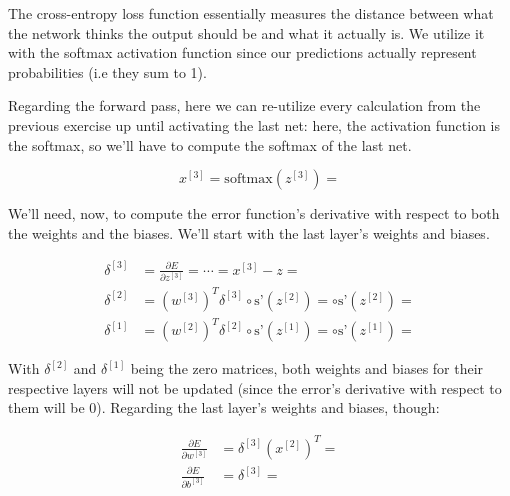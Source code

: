 \documentclass[12pt]{article}
\begin{document}
\begin{enumerate}[leftmargin=\labelsep]
  The cross-entropy loss function essentially measures the distance between what the
  network thinks the output should be and what it actually is. We utilize it with
  the softmax activation function since our predictions actually represent probabilities
  (i.e they sum to 1).

  Regarding the forward pass, here we can re-utilize every calculation from the previous
  exercise up until activating the last net: here, the activation function is the softmax,
  so we'll have to compute the softmax of the last net.

  \begin{equation*}
    x^{[3]} = \text{softmax}(z^{[3]}) = 
  \end{equation*}

  We'll need, now, to compute the error function's derivative with respect to both
  the weights and the biases. We'll start with the last layer's weights and biases.

  \begin{equation*}
    \begin{aligned}
      \delta^{[3]} & = \frac{\partial E}{\partial z^{[3]}} = \cdots = x^{[3]} - z =                                                        \\
      \delta^{[2]} & = (w^{[3]})^T \delta^{[3]} \circ \text{s'}(z^{[2]}) =  \circ \text{s'}(z^{[2]}) =  \\
      \delta^{[1]} & = (w^{[2]})^T \delta^{[2]} \circ \text{s'}(z^{[1]}) =  \circ \text{s'}(z^{[1]}) = 
    \end{aligned}
  \end{equation*}

  With $\delta^{[2]}$ and $\delta^{[1]}$ being the zero matrices, both weights and
  biases for their respective layers will not be updated (since the error's derivative
  with respect to them will be 0). Regarding the last layer's weights and biases, though:

  \begin{equation*}
    \begin{aligned}
      \frac{\partial E}{\partial w^{[3]}} & = \delta^{[3]} (x^{[2]})^T =                           \\
      \frac{\partial E}{\partial b^{[3]}} & = \delta^{[3]}  = 
    \end{aligned}
  \end{equation*}


\end{enumerate}
\end{document}

